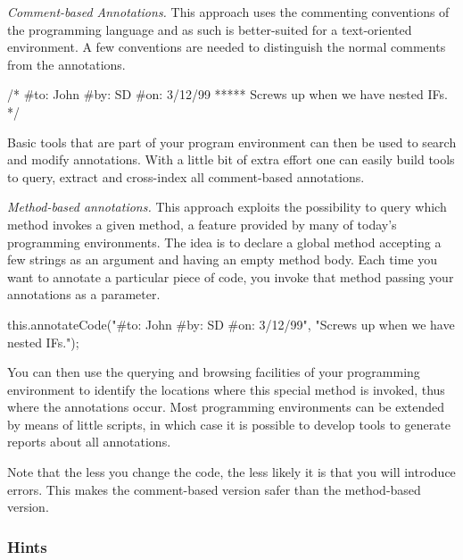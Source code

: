 \documentclass[a4paper,10pt,twoside]{book}
\begin{document}
\begin{bulletlist}
\item \emph{Comment-based Annotations.}
This approach uses the commenting conventions of the programming language and as such is better-suited for a text-oriented environment. A few conventions are needed to distinguish the normal comments from the annotations.
\begin{code}
/*  #to: John #by: SD #on: 3/12/99 *****
    Screws up when we have nested IFs. */
\end{code}
Basic tools that are part of your program environment can then be used to search and modify annotations. With a little bit of extra effort one can easily build tools to query, extract and cross-index all comment-based annotations.

\item \emph{Method-based annotations.}
This approach exploits the possibility to query which method invokes a given method, a feature provided by many of today's programming environments. The idea is to declare a global method accepting a few strings as an argument and having an empty method body. Each time you want to annotate a particular piece of code, you invoke that method passing your annotations as a parameter.
\begin{code}
this.annotateCode("#to: John #by: SD #on: 3/12/99",
    "Screws up when we have nested IFs.");
\end{code}
You can then use the querying and browsing facilities of your programming environment to identify the locations where this special method is invoked, thus where the annotations occur. Most programming environments can be extended by means of little scripts, in which case it is possible to develop tools to generate reports about all annotations.

Note that the less you change the code, the less likely it is that you will introduce errors. This makes the comment-based version safer than the method-based version.
\end{bulletlist}

\subsubsection*{Hints}
\end{document}
